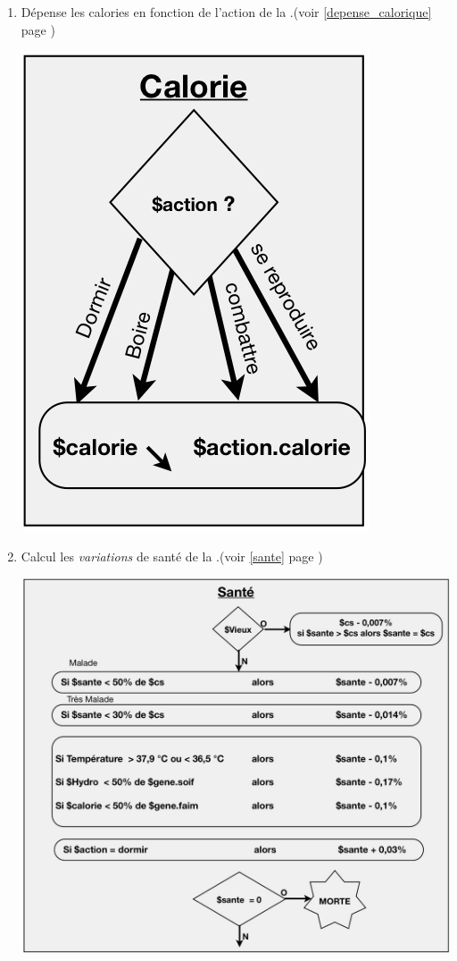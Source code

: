 \documentclass[french]{report}
\begin{document}
\begin{enumerate}
	\item Dépense les calories en fonction de l'action de la \CoCiX.(voir \ref{depense_calorique} page \pageref{depense_calorique})\\
	\begin{center}
		\includegraphics[width=0.5\linewidth]{images/cortex03.jpg}
	\end{center}
		
	\item Calcul les \textit{variations} de santé de la \CoCiX.(voir \ref{sante} page \pageref{sante})\\
	\begin{center}
		\includegraphics[width=1\linewidth]{images/cortex04.jpg}
	\end{center}
	

\end{enumerate}
\end{document}
